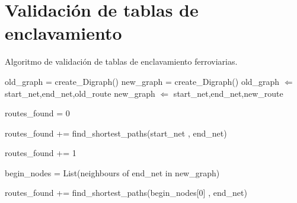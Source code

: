 \section{Validación de tablas de enclavamiento}

	\lipsum[1-5]
	
	
	\begin{algorithm}[hbt!]
		\caption{Algoritmo de validación de tablas de enclavamiento ferroviarias.}\label{alg:interlocking_tables}
		\DontPrintSemicolon
		\SetNoFillComment
		\LinesNotNumbered 
		old\_graph = create\_Digraph()\; 
		new\_graph = create\_Digraph()\; 
		{
			old\_graph $\Leftarrow$ start\_net,end\_net,old\_route\;
		}
		{
			new\_graph $\Leftarrow$ start\_net,end\_net,new\_route\;
		}
		
		routes\_found = 0\;
		{
			{
				routes\_found += find\_shortest\_paths(start\_net , end\_net)\;
			}
			\Else
			{
				{
					routes\_found += 1\;
				}
				\Else
				{
					{
						begin\_nodes = List(neighbours of end\_net in new\_graph)\;
						
						{
							routes\_found += find\_shortest\_paths(begin\_nodes[0] , end\_net)\;
						}
					}
				}
			}
		
		}

	\end{algorithm}
	
	\lipsum[1-5]